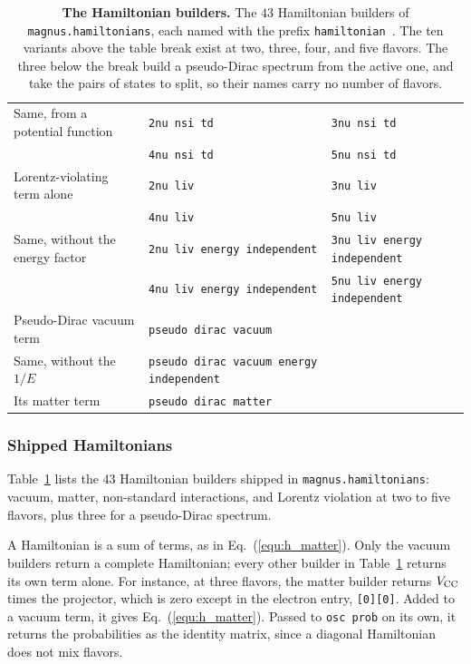 \documentclass[final,5p,times,twocolumn,sort,compress]{elsarticle}
\makeatletter
\newcommand{\eq}{Eq.}
\DeclareRobustCommand{\_}{%
  \ifmmode\nfss@text{\textunderscore}\else\textunderscore\allowbreak\fi}
\newcommand{\Tab}{Table}
\newcommand{\equ}[1]{\eq~(\ref{equ:#1})}
\newcommand{\tabl}[1]{\Tab~\ref{tab:#1}}
\makeatother
\begin{document}
{\begin{table}[t!]
{\begin{tabular}{@{}p{4.3cm}p{6.2cm}p{6.2cm}@{}}
 Same, from a potential function & {\tt 2nu\_nsi\_td} & {\tt 3nu\_nsi\_td} \\
  & {\tt 4nu\_nsi\_td} & {\tt 5nu\_nsi\_td} \\
 Lorentz-violating term alone & {\tt 2nu\_liv} & {\tt 3nu\_liv} \\
  & {\tt 4nu\_liv} & {\tt 5nu\_liv} \\
 Same, without the energy factor & {\tt 2nu\_liv\_energy\_independent} & {\tt 3nu\_liv\_energy\_independent} \\
  & {\tt 4nu\_liv\_energy\_independent} & {\tt 5nu\_liv\_energy\_independent} \\
 \hline
 Pseudo-Dirac vacuum term & {\tt pseudo\_dirac\_vacuum} &  \\
 Same, without the $1/E$ & {\tt pseudo\_dirac\_vacuum\_energy\_independent} &  \\
 Its matter term & {\tt pseudo\_dirac\_matter} &  \\
\end{tabular}}
\caption{\label{tab:hamiltonians}\textbf{The Hamiltonian builders.} The $43$ Hamiltonian builders of {\tt magnus.hamiltonians}, each named with the prefix {\tt hamiltonian\_}. The ten variants above the table break exist at two, three, four, and five flavors. The three below the break build a pseudo-Dirac spectrum from the active one, and take the pairs of states to split, so their names carry no number of flavors.}
\end{table}}


\subsubsection{Shipped Hamiltonians}
\label{sec:shipped_hamiltonians}

\tabl{hamiltonians} lists the 43 Hamiltonian builders shipped in {\tt magnus.hamiltonians}: vacuum, matter, non-standard interactions, and Lorentz violation at two to five flavors, plus three for a pseudo-Dirac spectrum.

A Hamiltonian is a sum of terms, as in \equ{h_matter}. Only the vacuum builders return a complete Hamiltonian; every other builder in \tabl{hamiltonians} returns its own term alone. For instance, at three flavors, the matter builder returns $V_{\rm CC}$ times the projector, which is zero except in the electron entry, {\tt [0][0]}. Added to a vacuum term, it gives \equ{h_matter}. Passed to {\tt osc\_prob} on its own, it returns the probabilities as the identity matrix, since a diagonal Hamiltonian does not mix flavors.
\end{document}
